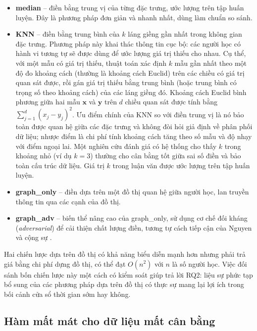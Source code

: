 \begin{itemize}[leftmargin=1.2cm,topsep=3pt]
  \item \textbf{median} -- điền bằng trung vị của từng đặc trưng, ước lượng trên tập huấn luyện. Đây là phương pháp đơn giản và nhanh nhất, dùng làm chuẩn so sánh.
  \item \textbf{KNN} -- điền bằng trung bình của $k$ láng giềng gần nhất trong không gian đặc trưng. Phương pháp này khai thác thông tin cục bộ: các người học có hành vi tương tự sẽ được dùng để ước lượng giá trị thiếu cho nhau. Cụ thể, với một mẫu có giá trị thiếu, thuật toán xác định $k$ mẫu gần nhất theo một độ đo khoảng cách (thường là khoảng cách Euclid) trên các chiều có giá trị quan sát được, rồi gán giá trị thiếu bằng trung bình (hoặc trung bình có trọng số theo khoảng cách) của các láng giềng đó. Khoảng cách Euclid bình phương giữa hai mẫu $\mathbf{x}$ và $\mathbf{y}$ trên $d$ chiều quan sát được tính bằng $\sum_{j=1}^{d}(x_j - y_j)^2$. Ưu điểm chính của KNN so với điền trung vị là nó bảo toàn được quan hệ giữa các đặc trưng và không đòi hỏi giả định về phân phối dữ liệu; nhược điểm là chi phí tính khoảng cách tăng theo số mẫu và độ nhạy với điểm ngoại lai. Một nghiên cứu đánh giá có hệ thống cho thấy $k$ trong khoảng nhỏ (ví dụ $k = 3$) thường cho cân bằng tốt giữa sai số điền và bảo toàn cấu trúc dữ liệu. Giá trị $k$ trong luận văn được ước lượng trên tập huấn luyện.
  \item \textbf{graph\_only} -- điền dựa trên một đồ thị quan hệ giữa người học, lan truyền thông tin qua các cạnh của đồ thị.
  \item \textbf{graph\_adv} -- biến thể nâng cao của graph\_only, sử dụng cơ chế đối kháng (\textit{adversarial}) để cải thiện chất lượng điền, tương tự cách tiếp cận của Nguyen và cộng sự \cite{Nguyen2025}.
\end{itemize}

Hai chiến lược dựa trên đồ thị có khả năng biểu diễn mạnh hơn nhưng phải trả giá bằng chi phí dựng đồ thị, có thể đạt $O(n^2)$ với $n$ là số người học. Việc đối sánh bốn chiến lược này một cách có kiểm soát giúp trả lời RQ2: liệu sự phức tạp bổ sung của các phương pháp dựa trên đồ thị có thực sự mang lại lợi ích trong bối cảnh cửa sổ thời gian sớm hay không.

\subsection{Hàm mất mát cho dữ liệu mất cân bằng}
\label{sec:hammatmat}

